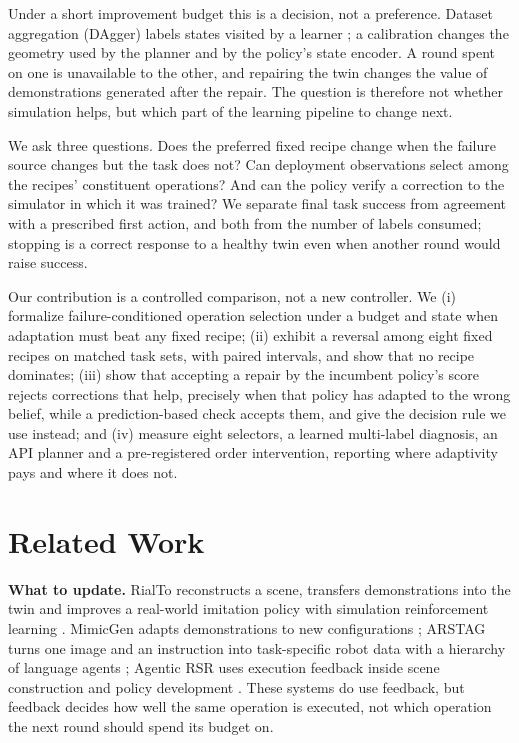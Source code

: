 \documentclass[conference]{IEEEtran}
\begin{document}
Under a short improvement budget this is a decision, not a preference. Dataset aggregation (DAgger) labels states visited by a learner \cite{ross2011dagger}; a calibration changes the geometry used by the planner and by the policy's state encoder. A round spent on one is unavailable to the other, and repairing the twin changes the value of demonstrations generated after the repair. The question is therefore not whether simulation helps, but which part of the learning pipeline to change next.

We ask three questions. Does the preferred fixed recipe change when the failure source changes but the task does not? Can deployment observations select among the recipes' constituent operations? And can the policy verify a correction to the simulator in which it was trained? We separate final task success from agreement with a prescribed first action, and both from the number of labels consumed; stopping is a correct response to a healthy twin even when another round would raise success.

Our contribution is a controlled comparison, not a new controller. We (i) formalize failure-conditioned operation selection under a budget and state when adaptation must beat any fixed recipe; (ii) exhibit a reversal among eight fixed recipes on matched task sets, with paired intervals, and show that no recipe dominates; (iii) show that accepting a repair by the incumbent policy's score rejects corrections that help, precisely when that policy has adapted to the wrong belief, while a prediction-based check accepts them, and give the decision rule we use instead; and (iv) measure eight selectors, a learned multi-label diagnosis, an API planner and a pre-registered order intervention, reporting where adaptivity pays and where it does not.

\section{Related Work}
\textbf{What to update.} RialTo reconstructs a scene, transfers demonstrations into the twin and improves a real-world imitation policy with simulation reinforcement learning \cite{rialto}. MimicGen adapts demonstrations to new configurations \cite{mandlekar2023mimicgen}; ARSTAG turns one image and an instruction into task-specific robot data with a hierarchy of language agents \cite{arstag}; Agentic RSR uses execution feedback inside scene construction and policy development \cite{agenticrsr}. These systems do use feedback, but feedback decides how well the same operation is executed, not which operation the next round should spend its budget on.
\end{document}
